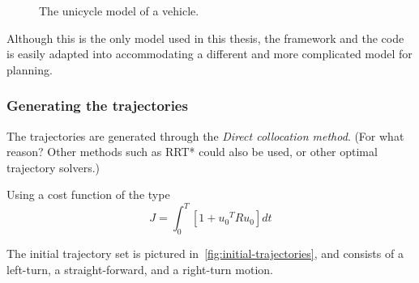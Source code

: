 \begin{figure}
  \centering {}
  \caption{The unicycle model of a vehicle.}
  \label{fig:second-order-unicycle}
\end{figure}

Although this is the only model used in this thesis, the framework and the code
is easily adapted into accommodating a different and more complicated model for
planning.


\subsubsection{Generating the trajectories}

The trajectories are generated through the \textit{Direct collocation method}.
(For what reason? Other methods such as RRT* could also be used, or other
optimal trajectory solvers.)

Using a cost function of the type
\begin{equation}
  J = \int_{0}^{T} \left[ 1 + {u_{0}}^{T}Ru_{0} \right] dt
\end{equation}

The initial trajectory set is pictured in~\ref{fig:initial-trajectories}, and
consists of a left-turn, a straight-forward, and a right-turn motion.

